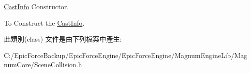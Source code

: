 \hyperlink{class_magnum_1_1_scene_collision_1_1_cast_info}{Cast\+Info} Constructor. 

To Construct the \hyperlink{class_magnum_1_1_scene_collision_1_1_cast_info}{Cast\+Info}. 

此類別(class) 文件是由下列檔案中產生\+:\begin{DoxyCompactItemize}
\item 
C\+:/\+Epic\+Force\+Backup/\+Epic\+Force\+Engine/\+Epic\+Force\+Engine/\+Magnum\+Engine\+Lib/\+Magnum\+Core/Scene\+Collision.\+h\end{DoxyCompactItemize}

